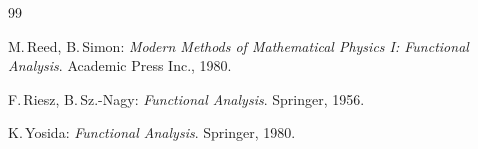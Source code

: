 \documentclass[11pt,twoside]{article}
\begin{document}
\newpage
\thispagestyle{empty}

\vspace{8mm}
\begin{thebibliography}{99}
\begin{small}

 M.\,Reed, B.\,Simon:
\textit{Modern Methods of Mathematical Physics I: Functional Analysis}.
Academic Press Inc., 1980.

 F.\,Riesz, B.\,Sz.-Nagy:
\textit{{Functional Analysis}}.
Springer, 1956.

  K.\,Yosida:
\textit{Functional Analysis}.
Springer, 1980.

\end{small}
\end{thebibliography}

\end{document}
